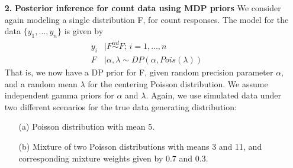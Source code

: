 \documentclass[a4paper, 10pt]{article}
\begin{document}
\begin{enumerate}
    \clearpage
    \item[\textbf{2.}] \textbf{Posterior inference for count data using MDP priors}
    We consider again modeling a single distribution F, for count responses. The model for the data $\{y_1,...,y_n \}$ is given by
    \begin{align*}
        y_i&|F \stackrel{iid}{\sim} F \text{;   } i = 1,...,n\\
        F&| \alpha, \lambda \sim  DP(\alpha, Pois(\lambda)) 
    \end{align*}
    That is, we now have a DP prior for F, given random precision parameter $\alpha$, and a random mean $\lambda$ for the centering Poisson distribution. We assume independent gamma priors for $\alpha$ and $\lambda$. Again, we use simulated data under two different scenarios for the true data generating distribution:
    \begin{itemize}
        \item[(a)] Poisson distribution with mean 5.
        \item[(b)] Mixture of two Poisson distributions with means 3 and 11, and corresponding mixture weights given by 0.7 and 0.3.
    \end{itemize}
    \begin{figure}[h!]
        \centering

\end{figure}
\end{enumerate}
\end{document}
